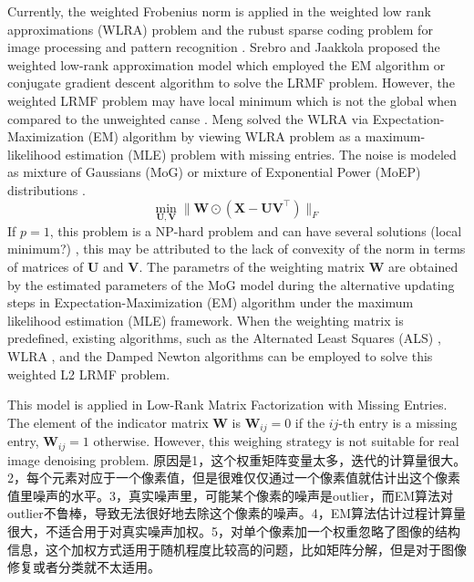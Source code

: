 \documentclass[10pt,twocolumn,letterpaper]{article}
\begin{document}
Currently, the weighted Frobenius norm is applied in the weighted low rank approximations (WLRA) problem \cite{srebro2003weighted} and the rubust sparse coding problem for image processing \cite{jiang2014mixed} and pattern recognition \cite{meng2013robust}. Srebro and Jaakkola \cite{srebro2003weighted} proposed the weighted low-rank approximation model which employed the EM algorithm or conjugate gradient descent algorithm to solve the LRMF problem. However, the weighted LRMF problem may have local minimum which is not the global when compared to the unweighted canse \cite{srebro2003weighted}. Meng \etal \cite{meng2013robust} solved the WLRA via Expectation-Maximization (EM) algorithm by viewing WLRA problem as a maximum-likelihood estimation (MLE) problem with missing entries. The noise is modeled as mixture of Gaussians (MoG) \cite{meng2013robust} or mixture of Exponential Power (MoEP) distributions \cite{Cao2015ICCV}.
\begin{equation}
\min_{\mathbf{U},\mathbf{V}}\|\mathbf{W}\odot(\mathbf{X}-\mathbf{U}\mathbf{V}^{\top})\|_{F}
\end{equation}
If $p=1$, this problem is a NP-hard problem and can have several solutions (local minimum?) \cite{GillisGlineur}, this may be attributed to the lack of convexity of the norm in terms of matrices of $\mathbf{U}$ and $\mathbf{V}$. The parametrs of the weighting matrix $\mathbf{W}$ are obtained by the estimated parameters of the MoG model during the alternative updating steps in Expectation-Maximization (EM) algorithm under the maximum likelihood estimation (MLE) framework. When the weighting matrix is predefined, existing algorithms, such as the Alternated
Least Squares (ALS) \cite{de2003framework}, WLRA \cite{srebro2003weighted}, and the Damped Newton algorithms \cite{buchanan2005damped} can be employed to solve this weighted L2 LRMF problem. 

This model is applied in Low-Rank Matrix Factorization with Missing Entries. The element of the indicator matrix $\mathbf{W}$ is $\mathbf{W}_{ij}=0$ if the $ij$-th entry is a missing entry, $\mathbf{W}_{ij}=1$ otherwise. However, this weighing strategy is not suitable for real image denoising problem. 原因是1，这个权重矩阵变量太多，迭代的计算量很大。2，每个元素对应于一个像素值，但是很难仅仅通过一个像素值就估计出这个像素值里噪声的水平。3，真实噪声里，可能某个像素的噪声是outlier，而EM算法对outlier不鲁棒，导致无法很好地去除这个像素的噪声。4，EM算法估计过程计算量很大，不适合用于对真实噪声加权。5，对单个像素加一个权重忽略了图像的结构信息，这个加权方式适用于随机程度比较高的问题，比如矩阵分解，但是对于图像修复或者分类就不太适用。
\end{document}
